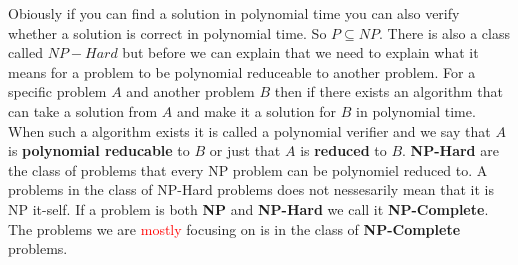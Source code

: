 Obiously if you can find a solution in polynomial time you can also verify whether a solution is correct in polynomial time. 
So $P\subseteq NP$. 
There is also a class called $NP-Hard$ but before we can explain that we need to explain what it means for a problem to be polynomial reduceable to another problem. 
For a specific problem $A$ and another problem $B$ then if there exists an algorithm that can take a solution from $A$ and make it a solution for $B$ in polynomial time. 
When such a algorithm exists it is called a polynomial verifier and we say that $A$ is \textbf{polynomial reducable} to $B$ or just that $A$ is \textbf{reduced} to $B$. 
\textbf{NP-Hard} are the class of problems that every NP problem can be polynomiel reduced to. 
A problems in the class of NP-Hard problems does not nessesarily mean that it is NP it-self.
If a problem is both \textbf{NP} and \textbf{NP-Hard} we call it \textbf{NP-Complete}. 
The problems we are \textcolor{red}{mostly} focusing on is in the class of \textbf{NP-Complete} problems.
   
